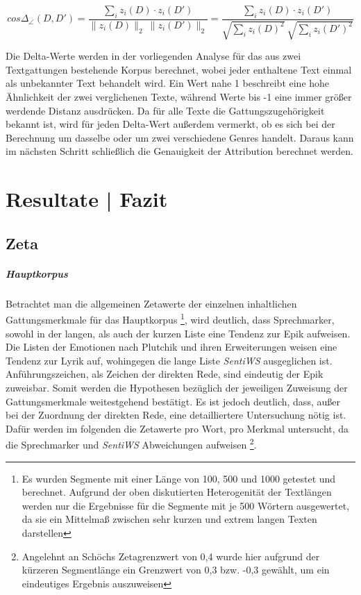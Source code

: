 \documentclass[a4paper,10p]{article}
\begin{document}
	 \begin{equ}[!h]
		\begin{equation}
		cos \Delta_\angle (D, D') = \frac{\sum_i z_i(D) \cdot z_i(D')}{\|z_i(D)\|_2 \ \|z_i(D')\|_2} = \frac{\sum_i z_i(D) \cdot z_i(D')}{\sqrt{\sum_i z_i(D)^2} \ \sqrt{\sum_i z_i(D')^2}}
		\end{equation}
	\end{equ}


Die Delta-Werte werden in der vorliegenden Analyse für das aus zwei Textgattungen bestehende Korpus berechnet, wobei jeder enthaltene Text einmal als unbekannter Text behandelt wird. Ein Wert nahe 1 beschreibt eine hohe Ähnlichkeit der zwei verglichenen Texte, während Werte bis -1 eine immer größer werdende Distanz ausdrücken. Da für alle Texte die Gattungszugehörigkeit  bekannt ist, wird für jeden Delta-Wert außerdem vermerkt, ob es sich bei der Berechnung um dasselbe oder um zwei verschiedene Genres handelt. Daraus kann im nächsten Schritt schließlich die Genauigkeit der Attribution berechnet werden.


\section{Resultate | Fazit}
\subsection{Zeta}
\subparagraph{Hauptkorpus} \quad \par 

Betrachtet man die allgemeinen Zetawerte der einzelnen inhaltlichen Gattungsmerkmale für das Hauptkorpus \footnote{Es wurden Segmente mit einer Länge von 100, 500 und 1000 getestet und berechnet. Aufgrund der oben diskutierten Heterogenität der Textlängen werden nur die Ergebnisse für die Segmente mit je 500 Wörtern ausgewertet, da sie ein Mittelmaß zwischen sehr kurzen und extrem langen Texten darstellen}, wird deutlich, dass Sprechmarker, sowohl in der langen, als auch der kurzen Liste eine Tendenz zur Epik aufweisen. Die Listen der Emotionen nach Plutchik und ihren Erweiterungen weisen eine Tendenz zur Lyrik auf, wohingegen die lange Liste \textit{SentiWS} ausgeglichen ist. Anführungszeichen, als Zeichen der direkten Rede, sind eindeutig der Epik zuweisbar. Somit werden die Hypothesen bezüglich der jeweiligen Zuweisung der Gattungsmerkmale weitestgehend bestätigt. Es ist jedoch deutlich, dass, außer bei der Zuordnung der direkten Rede, eine detailliertere Untersuchung nötig ist. Dafür werden im folgenden die Zetawerte pro Wort, pro Merkmal untersucht, da die Sprechmarker und \textit{SentiWS} Abweichungen aufweisen \footnote{Angelehnt an Schöchs Zetagrenzwert von 0,4 wurde hier aufgrund der kürzeren Segmentlänge ein Grenzwert von 0,3 bzw. -0,3 gewählt, um ein eindeutiges Ergebnis auszuweisen}.\par 
\end{document}
